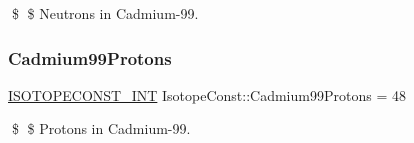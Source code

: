 \$ \$ Neutrons in Cadmium-\/99. \mbox{\label{group___isotope_const-_cadmium-_cd99_ga34aed348158cf056816d841c27bd8741}} 
\subsubsection{\texorpdfstring{Cadmium99\+Protons}{Cadmium99Protons}}
{\footnotesize\ttfamily \mbox{\hyperlink{group___isotope_const-_macros_ga5f18360b3e99483a35c32d789e62621c}{I\+S\+O\+T\+O\+P\+E\+C\+O\+N\+S\+T\+\_\+\+I\+NT}} Isotope\+Const\+::\+Cadmium99\+Protons = 48}

\$ \$ Protons in Cadmium-\/99. 